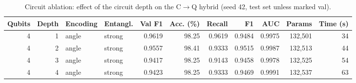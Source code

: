 \begin{table}[htbp]
\centering
\footnotesize
\caption{Circuit ablation: effect of the circuit depth on the C$\rightarrow$Q hybrid (seed 42, test set unless marked val).}
\label{tab:abl_depth}
\begin{adjustbox}{max width=\linewidth}
\begin{tabular}{rrllrrrrrrr}
\toprule
Qubits & Depth & Encoding & Entangl. & Val F1 & Acc. (\%) & Recall & F1 & AUC & Params & Time (s) \\
\midrule
4 & 1 & angle & strong & 0.9619 & 98.25 & 0.9619 & 0.9484 & 0.9975 & 132,501 & 34 \\
4 & 2 & angle & strong & 0.9557 & 98.41 & 0.9333 & 0.9515 & 0.9987 & 132,513 & 44 \\
4 & 3 & angle & strong & 0.9417 & 98.25 & 0.9143 & 0.9458 & 0.9978 & 132,525 & 54 \\
4 & 4 & angle & strong & 0.9423 & 98.25 & 0.9333 & 0.9469 & 0.9991 & 132,537 & 63 \\
\bottomrule
\end{tabular}
\end{adjustbox}
\end{table}
